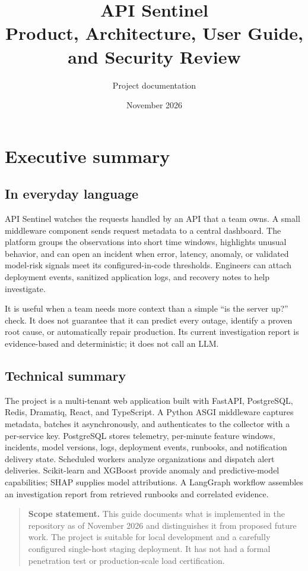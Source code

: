 \documentclass[11pt,a4paper]{article}
\title{\Huge\bfseries API Sentinel\\[0.4em]
\Large Product, Architecture, User Guide, and Security Review}
\author{Project documentation}
\date{November 2026}
\begin{document}
\maketitle
\tableofcontents
\newpage

\section{Executive summary}

\subsection{In everyday language}
API Sentinel watches the requests handled by an API that a team owns. A small
middleware component sends request metadata to a central dashboard. The platform
groups the observations into short time windows, highlights unusual behavior,
and can open an incident when error, latency, anomaly, or validated model-risk
signals meet its configured-in-code thresholds. Engineers can attach deployment
events, sanitized application logs, and recovery notes to help investigate.

It is useful when a team needs more context than a simple ``is the server up?''
check. It does not guarantee that it can predict every outage, identify a proven
root cause, or automatically repair production. Its current investigation report
is evidence-based and deterministic; it does not call an LLM.

\subsection{Technical summary}
The project is a multi-tenant web application built with FastAPI, PostgreSQL,
Redis, Dramatiq, React, and TypeScript. A Python ASGI middleware captures
metadata, batches it asynchronously, and authenticates to the collector with a
per-service key. PostgreSQL stores telemetry, per-minute feature windows,
incidents, model versions, logs, deployment events, runbooks, and notification
delivery state. Scheduled workers analyze organizations and dispatch alert
deliveries. Scikit-learn and XGBoost provide anomaly and predictive-model
capabilities; SHAP supplies model attributions. A LangGraph workflow assembles
an investigation report from retrieved runbooks and correlated evidence.

\begin{quote}
\textbf{Scope statement.} This guide documents what is implemented in the
repository as of November 2026 and distinguishes it from proposed future work.
The project is suitable for local development and a carefully configured
single-host staging deployment. It has not had a formal penetration test or
production-scale load certification.
\end{quote}
\end{document}
